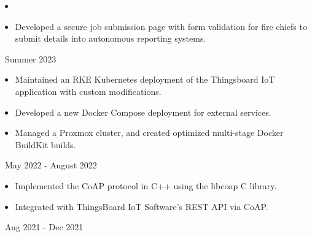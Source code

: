 \documentclass[11pt,letterpaper,ragged2e]{altacv}
\begin{document}

\hfuzz=5pt %

\begin{fullwidth}
	\makecvheader
\end{fullwidth}




{
	\begin{itemize}
    \item 
		\item Developed a secure job submission page with form validation for fire chiefs to submit details into autonomous reporting systems.
	\end{itemize}
}
{\faCalendar\, Summer 2023}
{
}


{
	\begin{itemize}
		\item Maintained an RKE Kubernetes deployment of the Thingsboard IoT application with custom modifications.
		\item Developed a new Docker Compose deployment for external services.
		\item Managed a Proxmox cluster, and created optimized multi-stage Docker BuildKit builds.
	\end{itemize}
}
{\faCalendar\, May 2022 - August 2022}
{
}

{
	\begin{itemize}
		\item Implemented the CoAP protocol in C++ using the libcoap C library.
		\item Integrated with ThingsBoard IoT Software's REST API via CoAP.
	\end{itemize}
}
{\faCalendar\, Aug 2021 - Dec 2021}
{
}
\end{document}
